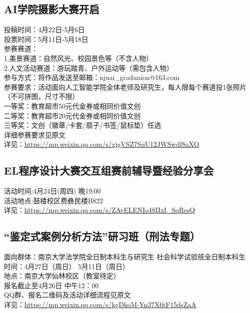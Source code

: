 \documentclass[letterpaper, 12pt]{article}
\begin{document}
\begin{multicols}{2}
\subsection{AI学院摄影大赛开启} %
投稿时间：4月22日-5月6日
\\投票时间：5月11日-5月18日
\\参赛赛道：
\\1.美景赛道：自然风光、校园景色等（不含人物）
\\2.人文活动赛道：游玩踏青、户外运动等（需包含人物）
\\参与方式：将作品发送至邮箱：njuai\_gradunion@163.com
\\参赛要求：活动面向人工智能学院全体老师及研究生，每人限每个赛道投1张照片（不可拼图，尺寸不限）
\\一等奖：教育超市50元代金券或相同价值文创
\\二等奖：教育超市20元代金券或相同价值文创
\\三等奖：文创（徽章/卡套/扇子/书签/鼠标垫）任选
\\详细参赛要求见原文
\\详见：\url{https://mp.weixin.qq.com/s/xjgVSZ7SnU12JWSwdf8aXQ}

\subsection{EL程序设计大赛交互组赛前辅导暨经验分享会} %
活动时间:4月24日(周四) 晚19:00
\\活动地点:鼓楼校区费彝民楼B822
\\详见：\url{https://mp.weixin.qq.com/s/ZAvELENIo48IIxI_SqResQ}

\subsection{“鉴定式案例分析方法”研习班（刑法专题）} %
面向群体：南京大学法学院全日制本科生与研究生 社会科学试验班全日制本科生
\\时间：4月27日（周日） 5月11日（周日）
\\地点：南京大学仙林校区（教室待定）
\\报名截止至4月26日 中午12：00
\\QQ群、报名二维码及活动详细流程见原文
\\详见：\url{https://mp.weixin.qq.com/s/kgDkoM-Yn37X6tF15dsZaA}


\end{multicols}
\end{document}
